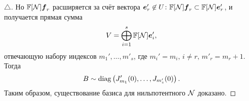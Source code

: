 \begin{proof}[$\triangle$]
    Но $\mathbb{F} [\mathcal N] \mbox{\boldmath $f$}_r$ расширяется за счёт вектора $\mbox{\boldmath $e$}'_r \not \in U \colon \mathbb{F}[\mathcal N] \mbox{\boldmath $f$}_r \subset \mathbb{F}[\mathcal N] \mbox{\boldmath $e$}'_r$, и получается прямая сумма
    $$
        V = \bigoplus_{i=1}^s \mathbb{F} [\mathcal N] \mbox{\boldmath $e$}_i',
    $$
    отвечающую набору индексов $m_{1}', \ldots, m'_s$, где $m_i' = m_i, \, i \neq r, \, m'_r = m_r + 1$. Тогда
    $$
        B \sim \mathop{\mathrm{diag}}\nolimits \left(J_{m_{1}}' (0), \ldots, J_{m_s'} (0)\right).
    $$
    Таким образом, существование базиса для нильпотентного $\mathcal N$ доказано.
\end{proof}







